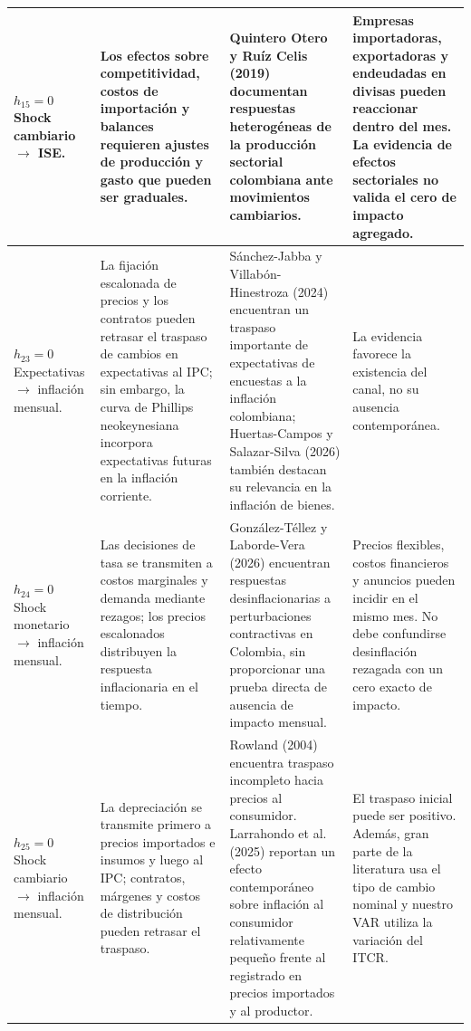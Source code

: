 \documentclass[12pt,letterpaper]{article}
\begin{document}
\begin{longtable}{@{}>{\raggedright\arraybackslash}p{}>{\raggedright\arraybackslash}p{}>{\raggedright\arraybackslash}p{}>{\raggedright\arraybackslash}p{}@{}}
\textbf{$h_{15}=0$}\newline
Shock cambiario $\rightarrow$ ISE.
& Los efectos sobre competitividad, costos de importación y balances requieren ajustes de producción y gasto que pueden ser graduales.
& Quintero Otero y Ruíz Celis (2019) documentan respuestas heterogéneas de la producción sectorial colombiana ante movimientos cambiarios.
& Empresas importadoras, exportadoras y endeudadas en divisas pueden reaccionar dentro del mes. La evidencia de efectos sectoriales no valida el cero de impacto agregado.\\
\midrule

\textbf{$h_{23}=0$}\newline
Expectativas $\rightarrow$ inflación mensual.
& La fijación escalonada de precios y los contratos pueden retrasar el traspaso de cambios en expectativas al IPC; sin embargo, la curva de Phillips neokeynesiana incorpora expectativas futuras en la inflación corriente.
& Sánchez-Jabba y Villabón-Hinestroza (2024) encuentran un traspaso importante de expectativas de encuestas a la inflación colombiana; Huertas-Campos y Salazar-Silva (2026) también destacan su relevancia en la inflación de bienes.
& La evidencia favorece la existencia del canal, no su ausencia contemporánea.\\
\midrule

\textbf{$h_{24}=0$}\newline
Shock monetario $\rightarrow$ inflación mensual.
& Las decisiones de tasa se transmiten a costos marginales y demanda mediante rezagos; los precios escalonados distribuyen la respuesta inflacionaria en el tiempo.
& González-Téllez y Laborde-Vera (2026) encuentran respuestas desinflacionarias a perturbaciones contractivas en Colombia, sin proporcionar una prueba directa de ausencia de impacto mensual.
& Precios flexibles, costos financieros y anuncios pueden incidir en el mismo mes. No debe confundirse desinflación rezagada con un cero exacto de impacto.\\
\midrule

\textbf{$h_{25}=0$}\newline
Shock cambiario $\rightarrow$ inflación mensual.
& La depreciación se transmite primero a precios importados e insumos y luego al IPC; contratos, márgenes y costos de distribución pueden retrasar el traspaso.
& Rowland (2004) encuentra traspaso incompleto hacia precios al consumidor. Larrahondo et al. (2025) reportan un efecto contemporáneo sobre inflación al consumidor relativamente pequeño frente al registrado en precios importados y al productor.
& El traspaso inicial puede ser positivo. Además, gran parte de la literatura usa el tipo de cambio nominal y nuestro VAR utiliza la variación del ITCR.\\
\midrule


\end{longtable}
\end{document}
